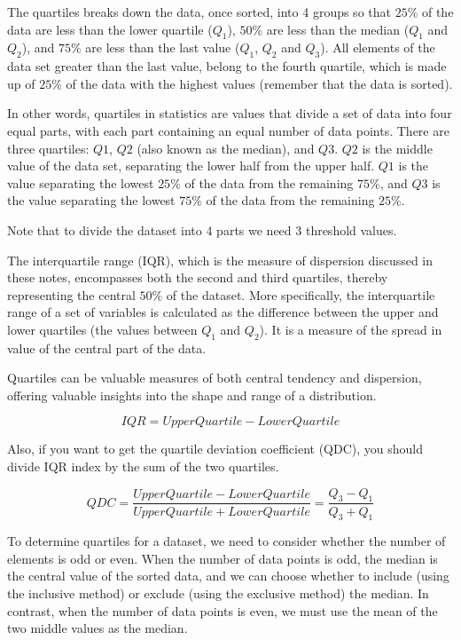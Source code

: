 \documentclass[
  letterpaper,
  DIV=11,
  numbers=noendperiod]{scrreprt}
\begin{document}
The quartiles breaks down the data, once sorted, into 4 groups so that
\(25 \%\) of the data are less than the lower quartile (\(Q_{1}\)),
\(50 \%\) are less than the median (\(Q_{1}\) and \(Q_{2}\)), and
\(75 \%\) are less than the last value (\(Q_{1}\), \(Q_{2}\) and
\(Q_{3}\)). All elements of the data set greater than the last value,
belong to the fourth quartile, which is made up of \(25 \%\) of the data
with the highest values (remember that the data is sorted).

In other words, quartiles in statistics are values that divide a set of
data into four equal parts, with each part containing an equal number of
data points. There are three quartiles: \(Q1\), \(Q2\) (also known as
the median), and \(Q3\). \(Q2\) is the middle value of the data set,
separating the lower half from the upper half. \(Q1\) is the value
separating the lowest \(25\%\) of the data from the remaining \(75\%\),
and \(Q3\) is the value separating the lowest \(75\%\) of the data from
the remaining \(25\%\).

Note that to divide the dataset into 4 parts we need 3 threshold values.

The interquartile range (IQR), which is the measure of dispersion
discussed in these notes, encompasses both the second and third
quartiles, thereby representing the central \(50\%\) of the dataset.
More specifically, the interquartile range of a set of variables is
calculated as the difference between the upper and lower quartiles (the
values between \(Q_{1}\) and \(Q_{2}\)). It is a measure of the spread
in value of the central part of the data.

Quartiles can be valuable measures of both central tendency and
dispersion, offering valuable insights into the shape and range of a
distribution.

\[
IQR = UpperQuartile - LowerQuartile
\]

Also, if you want to get the quartile deviation coefficient (QDC), you
should divide IQR index by the sum of the two quartiles.

\[
QDC = \frac{UpperQuartile - LowerQuartile}{UpperQuartile + LowerQuartile} = \frac{Q_{3} - Q_{1}}{Q_{3} + Q_{1}}
\]

To determine quartiles for a dataset, we need to consider whether the
number of elements is odd or even. When the number of data points is
odd, the median is the central value of the sorted data, and we can
choose whether to include (using the inclusive method) or exclude (using
the exclusive method) the median. In contrast, when the number of data
points is even, we must use the mean of the two middle values as the
median.
\end{document}
